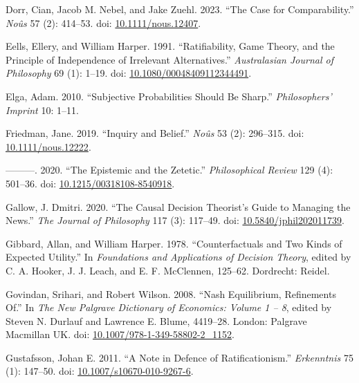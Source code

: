 \documentclass[
  11pt,
  letterpaper,
  DIV=11,
  numbers=noendperiod,
  twoside]{scrartcl}
\newlength{\cslhangindent}
\newenvironment{CSLReferences}[2] %
 {\begin{list}{}{%
  \setlength{\itemindent}{0pt}
  \setlength{\leftmargin}{0pt}
  \setlength{\parsep}{0pt}
  \ifodd #1
   \setlength{\leftmargin}{\cslhangindent}
   \setlength{\itemindent}{-1\cslhangindent}
  \fi
  \setlength{\itemsep}{#2\baselineskip}}}
 {\end{list}}
\begin{document}
\begin{CSLReferences}{1}{0}
Dorr, Cian, Jacob M. Nebel, and Jake Zuehl. 2023. {``The Case for
Comparability.''} \emph{Noûs} 57 (2): 414--53. doi:
\href{https://doi.org/10.1111/nous.12407}{10.1111/nous.12407}.

Eells, Ellery, and William Harper. 1991. {``Ratifiability, Game Theory,
and the Principle of Independence of Irrelevant Alternatives.''}
\emph{Australasian Journal of Philosophy} 69 (1): 1--19. doi:
\href{https://doi.org/10.1080/00048409112344491}{10.1080/00048409112344491}.

Elga, Adam. 2010. {``Subjective Probabilities Should Be Sharp.''}
\emph{Philosophers' Imprint} 10: 1--11.

Friedman, Jane. 2019. {``Inquiry and Belief.''} \emph{No{û}s} 53 (2):
296--315. doi:
\href{https://doi.org/10.1111/nous.12222}{10.1111/nous.12222}.

---------. 2020. {``The Epistemic and the Zetetic.''}
\emph{Philosophical Review} 129 (4): 501--36. doi:
\href{https://doi.org/10.1215/00318108-8540918}{10.1215/00318108-8540918}.

Gallow, J. Dmitri. 2020. {``The Causal Decision Theorist's Guide to
Managing the News.''} \emph{The Journal of Philosophy} 117 (3): 117--49.
doi:
\href{https://doi.org/10.5840/jphil202011739}{10.5840/jphil202011739}.

Gibbard, Allan, and William Harper. 1978. {``Counterfactuals and Two
Kinds of Expected Utility.''} In \emph{Foundations and Applications of
Decision Theory}, edited by C. A. Hooker, J. J. Leach, and E. F.
McClennen, 125--62. Dordrecht: Reidel.

Govindan, Srihari, and Robert Wilson. 2008. {``Nash Equilibrium,
Refinements Of.''} In \emph{The New Palgrave Dictionary of Economics:
Volume 1 -- 8}, edited by Steven N. Durlauf and Lawrence E. Blume,
4419--28. London: Palgrave Macmillan UK. doi:
\href{https://doi.org/10.1007/978-1-349-58802-2_1152}{10.1007/978-1-349-58802-2\_1152}.

Gustafsson, Johan E. 2011. {``A Note in Defence of Ratificationism.''}
\emph{Erkenntnis} 75 (1): 147--50. doi:
\href{https://doi.org/10.1007/s10670-010-9267-6}{10.1007/s10670-010-9267-6}.


\end{CSLReferences}
\end{document}
